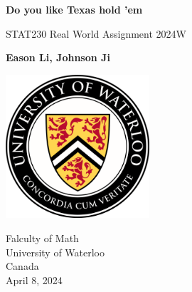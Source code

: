 \documentclass{article}
\begin{document}
\begin{titlepage}
    \begin{center}
        \vspace*{0.6cm}
            
        \Huge
        \textbf{Do you like Texas hold 'em}
            
        \vspace{0.5cm}
        \LARGE
        STAT230 Real World Assignment 2024W
            
        \vspace{1.5cm}
            
        \textbf{Eason Li, Johnson Ji}
            
        \vspace{3.6cm}
        
        \begin{center}
            \includegraphics[width = 0.4\textwidth]{images/UofLoo.png}
        \end{center}

        \vspace{0.4cm}
            
        \Large
        Falculty of Math \\
        University of Waterloo \\
        Canada \\
        April 8, 2024
    \end{center}
\end{titlepage}

\newpage
\end{document}
